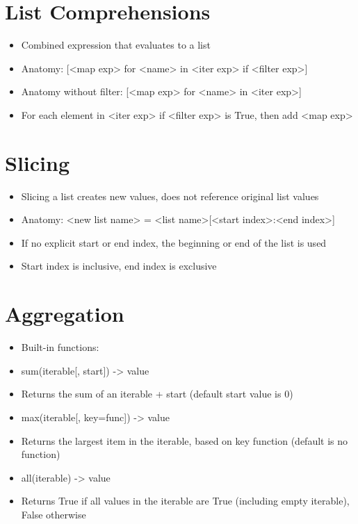 \section{List Comprehensions}
\begin{itemize}
    \item Combined expression that evaluates to a list
    \item Anatomy: [<map exp> for <name> in <iter exp> if <filter exp>]
    \item Anatomy without filter: [<map exp> for <name> in <iter exp>]
    \item For each element in <iter exp> if <filter exp> is True, then add <map exp>
\end{itemize}

\section{Slicing}
\begin{itemize}
    \item Slicing a list creates new values, does not reference original list values
    \item Anatomy: <new list name> = <list name>[<start index>:<end index>]
    \item If no explicit start or end index, the beginning or end of the list is used
    \item Start index is inclusive, end index is exclusive
\end{itemize}

\section{Aggregation}
\begin{itemize}
    \item Built-in functions:
    \item sum(iterable[, start]) -> value
    \item Returns the sum of an iterable + start (default start value is 0)
    \item max(iterable[, key=func]) -> value
    \item Returns the largest item in the iterable, based on key function (default is no function)
    \item all(iterable) -> value
    \item Returns True if all values in the iterable are True (including empty iterable), False otherwise
\end{itemize}


